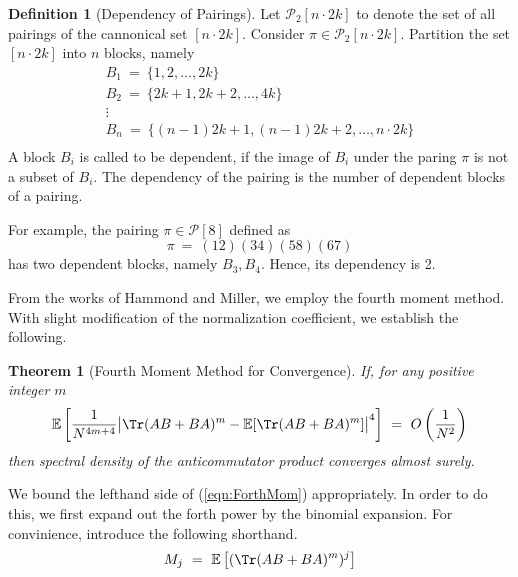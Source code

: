 \documentclass[12pt,reqno]{amsart}
\theoremstyle{plain} %
\newtheorem{theorem}{Theorem}[section]
\theoremstyle{remark}
\theoremstyle{definition}
\newtheorem*{defn}{Definition}
\newcommand{\E}{\mathbb E}
\begin{document}
\begin{defn}[Dependency of Pairings]
    Let $\mathcal{P}_2[n \cdot 2k]$ to denote the set of all pairings of the cannonical set 
    $[n\cdot 2k]$. Consider $\pi \in \mathcal{P}_2[n\cdot 2k]$. Partition the set 
    $[n\cdot 2k]$ into $n$ blocks, namely 
    \begin{eqnarray*}
    B_1 \ = \ \{1, 2, \dots, 2k\} \\ 
    B_2 \ = \ \{2k +1 , 2k +2, \dots, 4k\} \\
    \vdots \\
    B_n \ = \ \{(n - 1)2k +1 , (n - 1)2k +2, \dots, n\cdot 2k\} \\ 
    \end{eqnarray*}
    A block $B_i$ is called to be dependent, if the image of $B_i$ 
    under the paring $\pi$ is not a subset of $B_i$. The dependency 
    of the pairing is the number of dependent blocks of a pairing. 

    For example, the pairing $\pi \in \mathcal{P}[8]$ 
    defined as 
    \[
    \pi \ = \ (12)(34)(58)(67)
    \]
    has two dependent blocks, namely $B_3, B_4$. Hence, 
    its dependency is 2. 
\end{defn}

From the works of Hammond and Miller, we employ the fourth moment 
method. With slight modification of the normalization coefficient, 
we establish the following. 

\begin{theorem}[Fourth Moment Method for Convergence]
    If, for any positive integer $m$
    \begin{equation}\label{eqn:ForthMom}
        \E \left[
            \frac 1 {N^{4m + 4}}
            \big|
            \Tr(AB + BA)^m - \E[\Tr(AB + BA)^m]
            \big|^4
        \right]
         \ = \ O\left(
                \frac 1 {N^2}
            \right)
    \end{equation}
    then spectral density of the anticommutator product converges 
    almost surely. 
\end{theorem}

We bound the lefthand side of (\ref{eqn:ForthMom}) appropriately. In order 
to do this, we first expand out the forth power by the binomial 
expansion. For convinience, introduce the 
following shorthand. 
\[
    M_j \ = \ \E\left[(\Tr(AB + BA)^m)^j\right]
\] 
\end{document}
